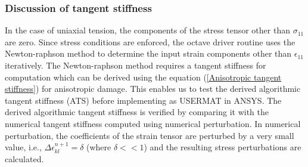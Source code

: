 \documentclass[12pt,a4paper,twoside,openright]{report}
\begin{document}
\subsubsection{Discussion of tangent stiffness}
\indent\indent\indent In the case of uniaxial tension, the components of the stress tensor other than $\sigma_{11}$ are zero. Since stress conditions are enforced, the octave driver routine \citep{codes} uses the Newton-raphson method to determine the input strain components other than $\epsilon_{11}$ iteratively. The Newton-raphson method requires a tangent stiffness for computation which can be derived using the equation (\ref{Anisotropic tangent stiffness}) for anisotropic damage. This enables us to test the derived algorithmic tangent stiffness (ATS) before implementing as USERMAT in ANSYS. The derived algorithmic tangent stiffness is verified by comparing it with the numerical tangent stiffness computed using numerical perturbation. In numerical perturbation, the coefficients of the strain tensor are perturbed by a very small value, i.e.,  $\Delta\epsilon_{kl}^{n+1} = \delta$ (where $\delta<<1$) and the resulting stress perturbations are calculated. 
\end{document}
